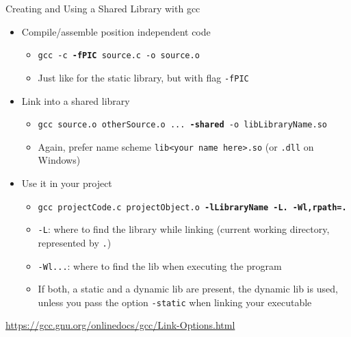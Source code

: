 \begin{frame}{Creating and Using a Shared Library with gcc}
%
\begin{itemize}
\item Compile/assemble position independent code
	\begin{itemize}
	\item \texttt{gcc -c \textbf{-fPIC} source.c -o source.o}
	\item Just like for the static library, but with flag \texttt{-fPIC}
	\end{itemize}
\item Link into a shared library
	\begin{itemize}
	\item \texttt{gcc source.o otherSource.o ... \textbf{-shared} -o libLibraryName.so}
	\item Again, prefer name scheme \texttt{lib<your name here>.so} (or \texttt{.dll} on Windows)
	\end{itemize}
\item Use it in your project
	\begin{itemize}
	\item \texttt{gcc projectCode.c projectObject.o \textbf{-lLibraryName -L. -Wl,rpath=.}}
	\item \texttt{-L}: where to find the library while linking (current working directory, represented by \texttt{.})
	\item \texttt{-Wl...}: where to find the lib when executing the program
	\item If both, a static and a dynamic lib are present, the dynamic lib is used, unless you pass the option \texttt{-static} when linking your executable
	\end{itemize}
\end{itemize}
%
\begin{hintbox}

\url{https://gcc.gnu.org/onlinedocs/gcc/Link-Options.html}
\end{hintbox}
%
\end{frame}


